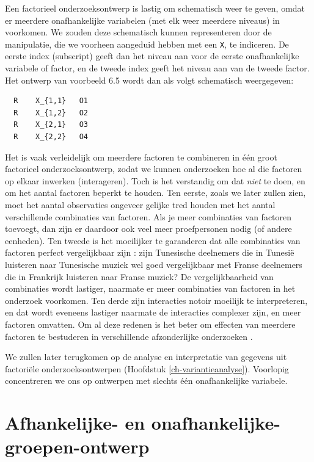 \documentclass[
]{book}
\begin{document}
Een factorieel onderzoeksontwerp is lastig om schematisch weer te geven,
omdat er meerdere onafhankelijke variabelen (met elk weer meerdere
niveaus) in voorkomen. We zouden deze schematisch kunnen representeren
door de manipulatie, die we voorheen aangeduid hebben met een \texttt{X}, te
indiceren. De eerste index (subscript) geeft dan het niveau aan voor de
eerste onafhankelijke variabele of factor, en de tweede index geeft het
niveau aan van de tweede factor. Het ontwerp van voorbeeld 6.5 wordt dan als volgt schematisch weergegeven:

\begin{verbatim}
  R    X_{1,1}   O1
  R    X_{1,2}   O2
  R    X_{2,1}   O3
  R    X_{2,2}   O4
\end{verbatim}

Het is vaak verleidelijk om meerdere factoren te combineren in één groot
factorieel onderzoeksontwerp, zodat we kunnen onderzoeken hoe al die
factoren op elkaar inwerken (interageren). Toch is het verstandig om dat
\emph{niet} te doen, en om het aantal factoren beperkt te houden. Ten eerste,
zoals we later zullen zien, moet het aantal observaties ongeveer gelijke
tred houden met het aantal verschillende combinaties van factoren. Als
je meer combinaties van factoren toevoegt, dan zijn er daardoor ook veel
meer proefpersonen nodig (of andere eenheden). Ten tweede is het
moeilijker te garanderen dat alle combinaties van factoren perfect
vergelijkbaar zijn \citep[p.266]{SCC02}: zijn Tunesische deelnemers die in
Tunesië luisteren naar Tunesische muziek wel goed vergelijkbaar met
Franse deelnemers die in Frankrijk luisteren naar Franse muziek? De
vergelijkbaarheid van combinaties wordt lastiger, naarmate er meer
combinaties van factoren in het onderzoek voorkomen. Ten derde zijn
interacties notoir moeilijk te interpreteren, en dat wordt eveneens
lastiger naarmate de interacties complexer zijn, en meer factoren
omvatten. Om al deze redenen is het beter om effecten van meerdere
factoren te bestuderen in verschillende afzonderlijke onderzoeken
\citep{Quene10}.

We zullen later terugkomen op de analyse en interpretatie van gegevens
uit factoriële onderzoeksontwerpen
(Hoofdstuk \ref{ch-variantieanalyse}). Voorlopig concentreren we ons op
ontwerpen met slechts één onafhankelijke variabele.

\section{Afhankelijke- en onafhankelijke-groepen-ontwerp}\label{sec:afhankelijkegroepen}
\end{document}
